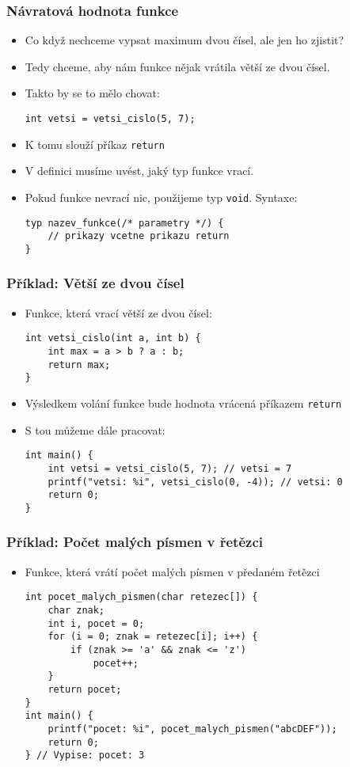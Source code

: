\documentclass{beamer}
\begin{document}
\begin{frame}[t,fragile]\frametitle{Návratová hodnota funkce} 
    \begin{itemize}
        \item Co když nechceme vypsat maximum dvou čísel, ale jen ho zjistit? 
        \item Tedy chceme, aby nám funkce nějak vrátila větší ze dvou čísel.
        \item Takto by se to mělo chovat: 
        \begin{verbatim} 
int vetsi = vetsi_cislo(5, 7);
        \end{verbatim}
        \item K tomu slouží příkaz \texttt{return} 
        \item V definici musíme uvést, jaký typ funkce vrací. 
        \item Pokud funkce nevrací nic, použijeme typ \texttt{void}. Syntaxe:
        \begin{verbatim} 
typ nazev_funkce(/* parametry */) {
    // prikazy vcetne prikazu return
}
        \end{verbatim}
    \end{itemize}
\end{frame}


\begin{frame}[t,fragile]\frametitle{Příklad: Větší ze dvou čísel} 
    \begin{itemize}
        \item Funkce, která vrací větší ze dvou čísel:
        \begin{verbatim} 
int vetsi_cislo(int a, int b) {
    int max = a > b ? a : b;
    return max;
}
        \end{verbatim}
        \item Výsledkem volání funkce bude hodnota vrácená příkazem \texttt{return}
        \item S tou můžeme dále pracovat:
        \begin{verbatim} 
int main() {
    int vetsi = vetsi_cislo(5, 7); // vetsi = 7
    printf("vetsi: %i", vetsi_cislo(0, -4)); // vetsi: 0
    return 0;
}
        \end{verbatim}
    \end{itemize}
\end{frame}


\begin{frame}[t,fragile]\frametitle{Příklad: Počet malých písmen v řetězci} 
    \begin{itemize}
        \item Funkce, která vrátí počet malých písmen v předaném řetězci
        \begin{verbatim} 
int pocet_malych_pismen(char retezec[]) {
    char znak;
    int i, pocet = 0;
    for (i = 0; znak = retezec[i]; i++) {
        if (znak >= 'a' && znak <= 'z') 
            pocet++;
    }
    return pocet;
}
int main() {
    printf("pocet: %i", pocet_malych_pismen("abcDEF"));
    return 0;
} // Vypise: pocet: 3
        \end{verbatim}
    \end{itemize}
\end{frame}
\end{document}
